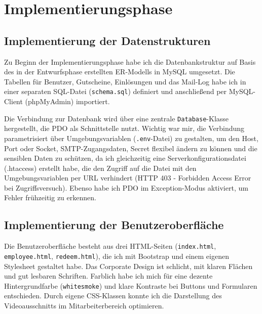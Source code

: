 \section{Implementierungsphase}
\label{sec:Implementierungsphase}

\subsection{Implementierung der Datenstrukturen}
\label{sec:ImplementierungDatenstrukturen}

Zu Beginn der Implementierungsphase habe ich die Datenbankstruktur auf Basis des in der Entwurfsphase erstellten ER-Modells in MySQL umgesetzt.
Die Tabellen für Benutzer, Gutscheine, Einlösungen und das Mail-Log habe ich in einer separaten SQL-Datei (\texttt{schema.sql}) definiert und anschließend per MySQL-Client (phpMyAdmin) importiert.



Die Verbindung zur Datenbank wird über eine zentrale \texttt{Database}-Klasse hergestellt, die \ac{PDO} als Schnittstelle nutzt.
Wichtig war mir, die Verbindung parametrisiert über Umgebungsvariablen (\texttt{.env}-Datei) zu gestalten, um den Host, Port oder Socket, SMTP-Zugangsdaten, Secret \usw flexibel ändern zu können und die sensiblen Daten zu schützen, da ich gleichzeitig eine Serverkonfigurationsdatei (.htaccess) erstellt habe, die den Zugriff auf die Datei mit den Umgebungsvariablen per \ac{URL} verhindert (HTTP 403 - Forbidden Access Error bei Zugriffsversuch).
Ebenso habe ich \ac{PDO} im Exception-Modus aktiviert, um Fehler frühzeitig zu erkennen.



\subsection{Implementierung der Benutzeroberfläche}
\label{sec:ImplementierungBenutzeroberflaeche}

Die Benutzeroberfläche besteht aus drei HTML-Seiten (\texttt{index.html}, \texttt{employee.html}, \texttt{redeem.html}),
die ich mit Bootstrap und einem eigenen Stylesheet gestaltet habe.
Das Corporate Design ist schlicht, mit klaren Flächen und gut lesbaren Schriften.
Farblich habe ich mich für eine dezente Hintergrundfarbe (\texttt{whitesmoke}) und klare Kontraste bei Buttons und Formularen entschieden.
Durch eigene CSS-Klassen konnte ich \zB die Darstellung des Videoausschnitts im Mitarbeiterbereich optimieren.

